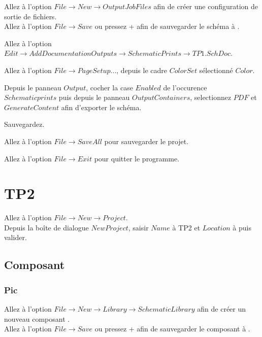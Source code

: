 \documentclass{report}
\begin{document}
Allez à l'option $File \rightarrow New \rightarrow Output Job Files$ afin de créer une configuration de sortie de fichiers. \\
Allez à l'option $File \rightarrow Save$ ou pressez \Ctrl +  afin de sauvegarder le schéma à . \\

\begin{asparaenum}[$\circ$]
    \item Allez à l'option $Edit \rightarrow Add Documentation Outputs \rightarrow Schematic Prints \rightarrow TP1.SchDoc$.
    \item Allez à l'option $File \rightarrow Page Setup...$, depuis le cadre $Color Set$ sélectionné $Color$.
    \item Depuis le panneau $Output$, cocher la case $Enabled$ de l'occurence $Schematic prints$ puis depuis le panneau $Output Containers$, selectionnez $PDF$ et $Generate Content$ afin d'exporter le schéma.
    \item Sauvegardez. \\
\end{asparaenum}

Allez à l'option $File \rightarrow Save All$ pour sauvegarder le projet. \par
Allez à l'option $File \rightarrow Exit$ pour quitter le programme.

\newpage
\section{TP2}

Allez à l'option $File \rightarrow New \rightarrow Project$. \\
Depuis la boîte de dialogue $New Project$, saisir $Name$ à \og TP2 \fg{ } et $Location$ à  puis valider.

\subsection{Composant}

\subsubsection{Pic}

Allez à l'option $File \rightarrow New \rightarrow Library \rightarrow Schematic Library$ afin de créer un nouveau composant . \\
Allez à l'option $File \rightarrow Save$ ou pressez \Ctrl +  afin de sauvegarder le composant à . \\
\end{document}
